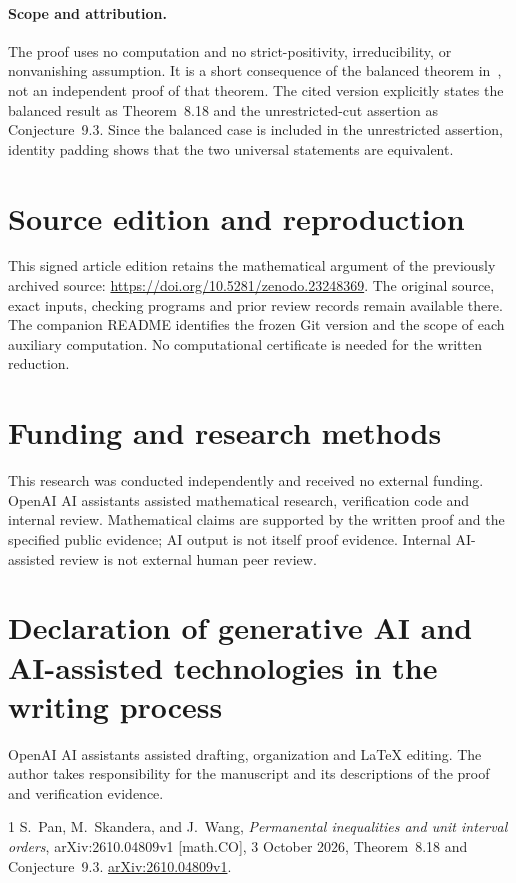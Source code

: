 \documentclass[11pt]{article}
\begin{document}
\paragraph{Scope and attribution.}
The proof uses no computation and no strict-positivity, irreducibility, or nonvanishing assumption. It is a short consequence of the balanced theorem in~\cite{PSW}, not an independent proof of that theorem. The cited version explicitly states the balanced result as Theorem~8.18 and the unrestricted-cut assertion as Conjecture~9.3. Since the balanced case is included in the unrestricted assertion, identity padding shows that the two universal statements are equivalent.


\section*{Source edition and reproduction}
This signed article edition retains the mathematical argument of the
previously archived source: \url{https://doi.org/10.5281/zenodo.23248369}.
The original source, exact inputs, checking programs and prior review
records remain available there. The companion README identifies the
frozen Git version and the scope of each auxiliary computation.
No computational certificate is needed for the written reduction.

\section*{Funding and research methods}
This research was conducted independently and received no external
funding. OpenAI AI assistants assisted mathematical research, verification
code and internal review. Mathematical claims are supported by the
written proof and the specified public evidence; AI output is not itself
proof evidence. Internal AI-assisted review is not external human peer
review.
\section*{Declaration of generative AI and AI-assisted technologies
in the writing process}
OpenAI AI assistants assisted drafting, organization and LaTeX editing.
The author takes responsibility for the manuscript and its descriptions
of the proof and verification evidence.

\begin{thebibliography}{1}
S.~Pan, M.~Skandera, and J.~Wang,
\emph{Permanental inequalities and unit interval orders},
arXiv:2610.04809v1 [math.CO], 3 October 2026,
Theorem~8.18 and Conjecture~9.3.
\href{https://arxiv.org/abs/2610.04809v1}{arXiv:2610.04809v1}.
\end{thebibliography}
\end{document}
